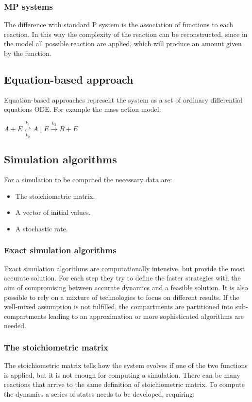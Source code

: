     \subsubsection{MP systems}
    The difference with standard P system is the association of functions to each reaction.
    In this way the complexity of the reaction can be reconstructed, since in the model all possible reaction are applied, which will produce an amount given by the function.

  \subsection{Equation-based approach}
  Equation-based approaches represent the system as a set of ordinary differential equations ODE.
  For example the mass action model:

  \(A+E \underset{k_2}{\overset{k_1}{\rightleftharpoons}}A \mid E \stackrel{k_3}{\longrightarrow}B+E\)

  \subsection{Simulation algorithms}
  For a simulation to be computed the necessary data are:

  \begin{multicols}{2}
    \begin{itemize}
      \item The stoichiometric matrix.
      \item A vector of initial values.
      \item A stochastic rate.
    \end{itemize}
  \end{multicols}

    \subsubsection{Exact simulation algorithms}
    Exact simulation algorithms are computationally intensive, but provide the most accurate solution.
    For each step they try to define the faster strategies with the aim of compromising between accurate dynamics and a feasible solution.
    It is also possible to rely on a mixture of technologies to focus on different results.
    If the well-mixed assumption is not fulfilled, the compartments are partitioned into sub-compartments leading to an approximation or more sophisticated algorithms are needed.

    \subsubsection{The stoichiometric matrix}
    The stoichiometric matrix tells how the system evolves if one of the two functions is applied, but it is not enough for computing a simulation.
    There can be many reactions that arrive to the same definition of stoichiometric matrix.
    To compute the dynamics a series of states needs to be developed, requiring:

